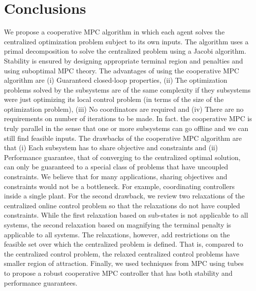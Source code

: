 \documentclass[10pt]{article}
\theoremstyle{definition}
\begin{document}
\section{Conclusions}
\label{sec:conclusions}
We propose a cooperative MPC algorithm in which each agent solves the
centralized optimization problem subject to its own inputs. The
algorithm uses a primal decomposition to solve the centralized problem
using a Jacobi algorithm. Stability is ensured by designing
appropriate terminal region and penalties and using suboptimal MPC theory.
The advantages of using the cooperative MPC algorithm are (i) Guaranteed closed-loop properties, (ii) The optimization problems solved by the subsystems are of the same complexity if they subsystems were just optimizing its local control problem (in terms of the size of the optimization problem), (iii) No coordinators are required and (iv) There are no requirements on number of iterations to be made. In fact. the cooperative MPC is truly parallel in the sense that one or more subsystems can go offline and we can still find feasible inputs. 
The drawbacks of the cooperative MPC algorithm are that (i) Each subsystem has to share objective and constraints and (ii) Performance guarantee, that of converging to the centralized optimal solution, can only be guaranteed to a special class of problems that have uncoupled constraints. We believe that for many applications, sharing objectives and constraints would not be a bottleneck. For example, coordinating controllers inside a single plant. For the second drawback, we review two relaxations of the centralized online control problem so that the relaxations do not have coupled constraints. While the first relaxation based on sub-states is not applicable to all systems, the second relaxation based on magnifying the terminal penalty is applicable to all systems. The relaxations, however, add restrictions on the feasible set over which the centralized problem is defined. That is, compared to the centralized control problem, the relaxed centralized control problems have smaller region of attraction. Finally, we used techniques from MPC using tubes to propose
a robust cooperative MPC controller that has both stability and
performance guarantees.

{
}
\end{document}
